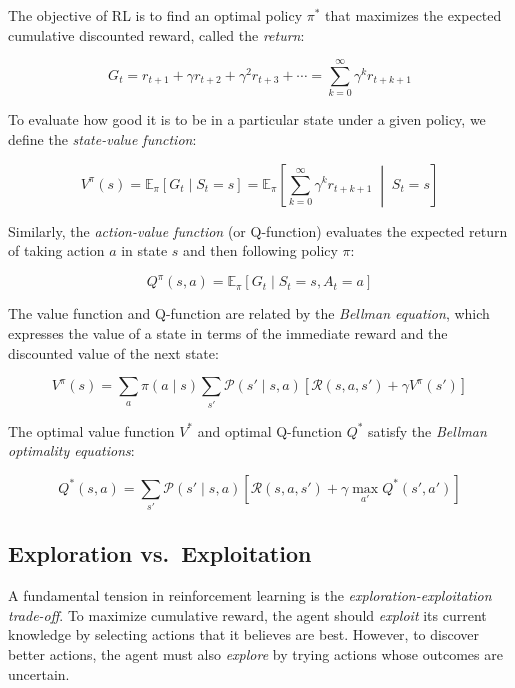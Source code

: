 The objective of RL is to find an optimal policy $\pi^*$ that maximizes the expected cumulative discounted reward, called the \textit{return}:

\begin{equation}
    G_t = r_{t+1} + \gamma r_{t+2} + \gamma^2 r_{t+3} + \cdots = \sum_{k=0}^{\infty} \gamma^k r_{t+k+1}
\end{equation}

To evaluate how good it is to be in a particular state under a given policy, we define the \textit{state-value function}:

\begin{equation}
    V^\pi(s) = \mathbb{E}_\pi\left[ G_t \mid S_t = s \right] = \mathbb{E}_\pi\left[ \sum_{k=0}^{\infty} \gamma^k r_{t+k+1} \;\middle|\; S_t = s \right]
\end{equation}

Similarly, the \textit{action-value function} (or Q-function) evaluates the expected return of taking action $a$ in state $s$ and then following policy $\pi$:

\begin{equation}
    Q^\pi(s, a) = \mathbb{E}_\pi\left[ G_t \mid S_t = s, A_t = a \right]
\end{equation}

The value function and Q-function are related by the \textit{Bellman equation}, which expresses the value of a state in terms of the immediate reward and the discounted value of the next state:

\begin{equation}
    V^\pi(s) = \sum_a \pi(a \mid s) \sum_{s'} \mathcal{P}(s' \mid s, a) \left[ \mathcal{R}(s, a, s') + \gamma V^\pi(s') \right]
\end{equation}

The optimal value function $V^*$ and optimal Q-function $Q^*$ satisfy the \textit{Bellman optimality equations}:

\begin{equation}
    Q^*(s, a) = \sum_{s'} \mathcal{P}(s' \mid s, a) \left[ \mathcal{R}(s, a, s') + \gamma \max_{a'} Q^*(s', a') \right]
\end{equation}

\subsection{Exploration vs.\ Exploitation}

A fundamental tension in reinforcement learning is the \textit{exploration-exploitation trade-off}. To maximize cumulative reward, the agent should \textit{exploit} its current knowledge by selecting actions that it believes are best. However, to discover better actions, the agent must also \textit{explore} by trying actions whose outcomes are uncertain.

